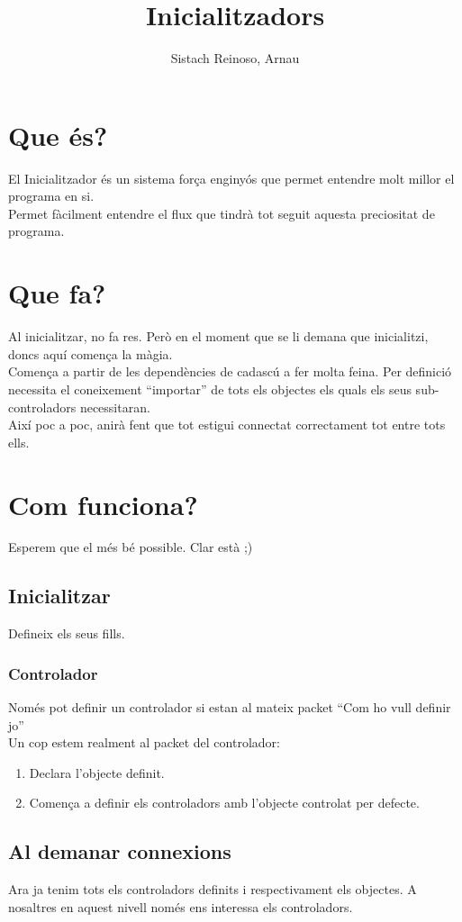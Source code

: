 \documentclass{article}
\author{Sistach Reinoso, Arnau}
\title{Inicialitzadors}
\begin{document}
\maketitle
\newpage

\section{Que és?}
El Inicialitzador és un sistema força enginyós que permet entendre molt millor el programa en si.\\
Permet fàcilment entendre el flux que tindrà tot seguit aquesta preciositat de programa.\\

\section{Que fa?}
Al inicialitzar, no fa res. Però en el moment que se li demana que inicialitzi, doncs aquí comença la màgia.\\
Comença a partir de les dependències de cadascú a fer molta feina. Per definició necessita el coneixement ``importar'' de tots els objectes
els quals els seus sub-controladors necessitaran.\\
Així poc a poc, anirà fent que tot estigui connectat correctament tot entre tots ells.\\

\section{Com funciona?}
Esperem que el més bé possible. Clar està ;)
\subsection{Inicialitzar}
Defineix els seus fills.\\
\subsubsection{Controlador}
Només pot definir un controlador si estan al mateix packet ``Com ho vull definir jo''\\
Un cop estem realment al packet del controlador:
\begin{enumerate}
\item Declara l'objecte definit.
\item Comença a definir els controladors amb l'objecte controlat per defecte.
\end{enumerate}
\subsection{Al demanar connexions}
Ara ja tenim tots els controladors definits i respectivament els objectes. A nosaltres en aquest nivell només ens interessa els controladors.\\
\end{document}
